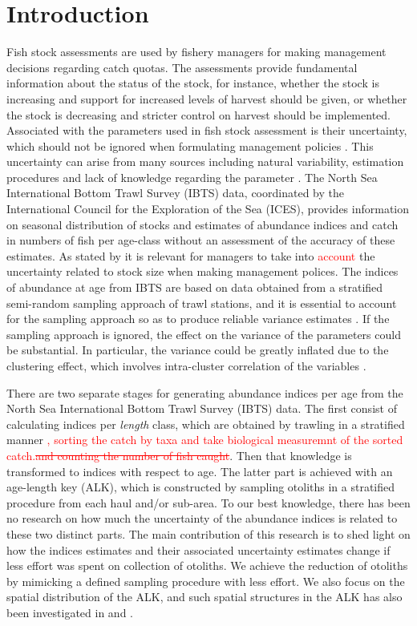 \documentclass[a4paper 12pt]{article}
\numberwithin{equation}{section}
\newcommand{\ed}[1]{\textcolor{red}{#1}}
\begin{document}
\section{Introduction}
Fish stock assessments are used by fishery managers for making management decisions regarding catch quotas. The assessments provide fundamental information about the status of the stock, for instance, whether the stock is increasing and support for increased levels of harvest should be given, or whether the stock is decreasing and stricter control on harvest should be implemented. Associated with the parameters used in fish stock assessment is their uncertainty, which should not be ignored when formulating management policies \citep{walters1981effects, ludwig1981measurement, berg2014evaluation}. This uncertainty can arise from many sources including natural variability, estimation procedures and lack of knowledge regarding the parameter \citep{ehrhardt1997role}. The North Sea International Bottom Trawl Survey (IBTS) data, coordinated by the International Council for the Exploration of the Sea (ICES), provides information on seasonal distribution of stocks and estimates of abundance indices and catch in numbers of fish per age-class without an assessment of the accuracy of these estimates. As stated by \citet{ludwig1981measurement} it is relevant for managers to take into \ed{account} the uncertainty related to stock size when making management polices. The indices of abundance at age from IBTS  are based on data obtained from a stratified semi-random sampling approach of trawl stations,  and  it is essential to account for the sampling approach so as to produce reliable variance estimates \citep{lehtonen2004practical}. If the sampling approach is ignored, the effect on the variance  of the parameters could be substantial.  In particular, the variance could be greatly inflated  due to the clustering effect, which involves intra-cluster correlation of the variables \citep{aanes2015efficient, lehtonen2004practical}. 

There are two separate stages for generating abundance indices per age from the North Sea International Bottom Trawl Survey (IBTS) data.  The first consist of calculating indices per \textit{length} class, which are obtained by trawling in a stratified manner \ed{, sorting the catch by taxa and take biological measuremnt of the sorted catch.\sout{and counting the number of fish caught}}. Then that knowledge is transformed to indices with respect to age. The latter part is achieved with an age-length key (ALK), which is constructed by sampling otoliths in a stratified procedure from each haul and/or sub-area. To our best knowledge, there has been no research on how much the uncertainty of the abundance indices is related to these two distinct parts. The main contribution of this research is to shed light on how the indices estimates and their associated uncertainty estimates change if less effort was spent on collection of otoliths. We achieve the reduction of otoliths by mimicking a defined sampling procedure with less effort. We also focus on the spatial distribution of the ALK, and such spatial structures in the ALK has also been investigated in \citet{berg2012spatial} and  \citet{hirst2012bayesian}.
\end{document}
